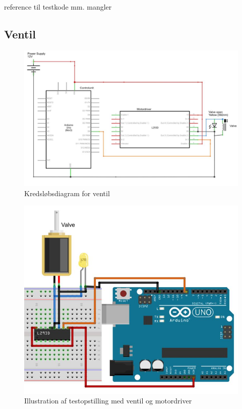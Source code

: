 reference til testkode mm. mangler


 \subsection{Ventil}
 
\begin{figure}[H]
	\centering
	\includegraphics[width=1\textwidth]{billeder/Hardware/diagrammer/ventildiagram.JPG}
	\caption{Kredsløbsdiagram for ventil}
	\label{fig:ventildiagram}
\end{figure} 

\begin{figure}[H]
	\centering
	\includegraphics[width=1\textwidth]{billeder/Hardware/diagrammer/Ventilbreadboard.JPG}
	\caption{Illustration af testopstilling med ventil og motordriver}
	\label{fig:ventilbreadboard}
\end{figure} 


